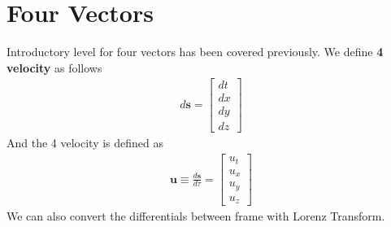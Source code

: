 \documentclass[12pt]{book}
\begin{document}
\section{Four Vectors}
Introductory level for four vectors has been covered previously. We define \textbf{4 velocity} as follows
\begin{align}
d\mathbf{s} = \begin{bmatrix}
    dt\\dx\\dy\\dz
\end{bmatrix}
\end{align}
And the 4 velocity is defined as
\begin{align}
\mathbf{u}\equiv \frac{d\mathbf{s}}{d\tau}=
\begin{bmatrix}
    u_t\\u_x\\u_y\\u_z
\end{bmatrix}
\end{align}
We can also convert the differentials between frame with Lorenz Transform.
\end{document}
